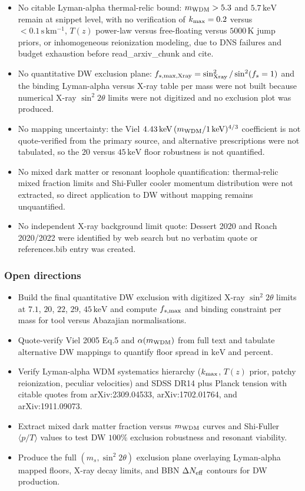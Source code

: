 \documentclass[11pt,a4paper]{article}
\begin{document}
\begin{itemize}
  \item No citable Lyman-alpha thermal-relic bound: $m_{\rm WDM} > 5.3$ and $5.7\,\mathrm{keV}$ remain at snippet level, with no verification of $k_{\rm max} = 0.2$ versus $<0.1\,\mathrm{s\,km^{-1}}$, $T(z)$ power-law versus free-floating versus $5000\,\mathrm{K}$ jump priors, or inhomogeneous reionization modeling, due to DNS failures and budget exhaustion before read\_arxiv\_chunk and cite.
  \item No quantitative DW exclusion plane: $f_{s,{\rm max,Xray}} = \sin^2_{\rm Xray}/\sin^2(f_s=1)$ and the binding Lyman-alpha versus X-ray table per mass were not built because numerical X-ray $\sin^2 2\theta$ limits were not digitized and no exclusion plot was produced.
  \item No mapping uncertainty: the Viel $4.43\,\mathrm{keV}\,(m_{\rm WDM}/1\,\mathrm{keV})^{4/3}$ coefficient is not quote-verified from the primary source, and alternative prescriptions were not tabulated, so the $20$ versus $45\,\mathrm{keV}$ floor robustness is not quantified.
  \item No mixed dark matter or resonant loophole quantification: thermal-relic mixed fraction limits and Shi-Fuller cooler momentum distribution were not extracted, so direct application to DW without mapping remains unquantified.
  \item No independent X-ray background limit quote: Dessert 2020 and Roach 2020/2022 were identified by web search but no verbatim quote or references.bib entry was created.
\end{itemize}
\subsubsection*{Open directions}
\begin{itemize}
  \item Build the final quantitative DW exclusion with digitized X-ray $\sin^2 2\theta$ limits at $7.1$, $20$, $22$, $29$, $45\,\mathrm{keV}$ and compute $f_{s,{\rm max}}$ and binding constraint per mass for tool versus Abazajian normalisations.
  \item Quote-verify Viel 2005 Eq.5 and $\alpha(m_{\rm WDM})$ from full text and tabulate alternative DW mappings to quantify floor spread in $\mathrm{keV}$ and percent.
  \item Verify Lyman-alpha WDM systematics hierarchy ($k_{\rm max}$, $T(z)$ prior, patchy reionization, peculiar velocities) and SDSS DR14 plus Planck tension with citable quotes from arXiv:2309.04533, arXiv:1702.01764, and arXiv:1911.09073.
  \item Extract mixed dark matter fraction versus $m_{\rm WDM}$ curves and Shi-Fuller $\langle p/T \rangle$ values to test DW $100\%$ exclusion robustness and resonant viability.
  \item Produce the full $(m_s, \sin^2 2\theta)$ exclusion plane overlaying Lyman-alpha mapped floors, X-ray decay limits, and BBN $\Delta N_{\rm eff}$ contours for DW production.
\end{itemize}
\end{document}
